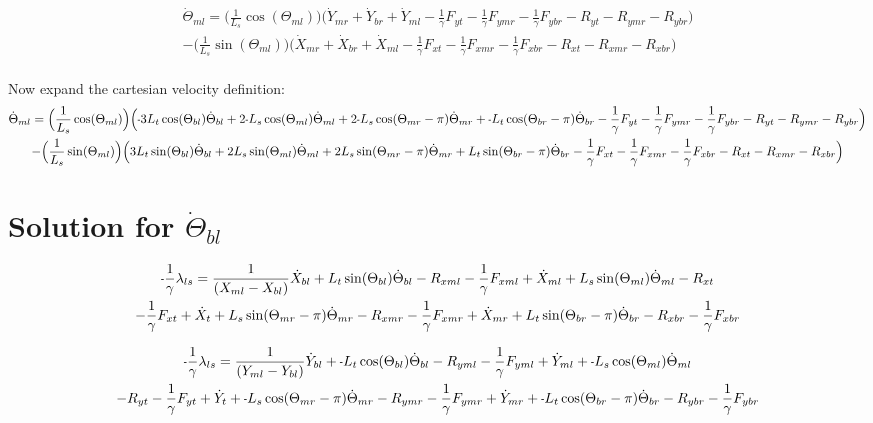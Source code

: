 \documentclass[11pt, landscape]{article}
\newcommand{\mn}{\scalebox{0.7}[1.0]{-}}
\begin{document}
\begin{multline}
\dot{\Theta}_{ml} =
\Big(\frac{1}{L_s}\cos(\Theta_{ml})\Big) \Big(\dot{Y}_{mr} + \dot{Y}_{br} + \dot{Y}_{ml}
- \frac{1}{\gamma}F_{yt } - \frac{1}{\gamma}F_{ymr} - \frac{1}{\gamma}F_{ybr} - R_{yt} - R_{ymr} - R_{ybr} \Big) \\
- \Big(\frac{1}{L_s}\sin(\Theta_{ml})\Big)\Big(\dot{X}_{mr} + \dot{X}_{br} + \dot{X}_{ml}
- \frac{1}{\gamma}F_{xt } - \frac{1}{\gamma}F_{xmr} - \frac{1}{\gamma}F_{xbr} - R_{xt } - R_{xmr} - R_{xbr} \Big)
\end{multline}
\\
Now expand the cartesian velocity definition: \\

\begin{multline}
\dot{\Theta}_{ml} =
\Big(\frac{1}{L_s}\cos(\Theta_{ml})\Big) \Big(\mn3L_{t}\cos(\Theta_{bl})\dot{\Theta}_{bl} + 2\mn L_{s}\cos(\Theta_{ml})\dot{\Theta}_{ml} + 2\mn L_{s}\cos(\Theta_{mr}-\pi)\dot{\Theta}_{mr} + \mn L_{t}\cos(\Theta_{br}-\pi)\dot{\Theta}_{br}
- \frac{1}{\gamma}F_{yt } - \frac{1}{\gamma}F_{ymr} - \frac{1}{\gamma}F_{ybr} - R_{yt} - R_{ymr} - R_{ybr} \Big) \\
- \Big(\frac{1}{L_s}\sin(\Theta_{ml})\Big)\Big(3L_{t}\sin(\Theta_{bl})\dot{\Theta}_{bl} + 2L_{s}\sin(\Theta_{ml})\dot{\Theta}_{ml} + 2L_{s}\sin(\Theta_{mr}-\pi)\dot{\Theta}_{mr} + L_{t}\sin(\Theta_{br}-\pi)\dot{\Theta}_{br}
- \frac{1}{\gamma}F_{xt } - \frac{1}{\gamma}F_{xmr} - \frac{1}{\gamma}F_{xbr} - R_{xt } - R_{xmr} - R_{xbr} \Big)
\end{multline}


\section{Solution for $\dot{\Theta}_{bl}$}

\begin{multline}
\mn\frac{1}{\gamma}\lambda_{ls} =
\frac{1}{(X_{ml} - X_{bl})}\dot{X}_{bl} + L_{t}\sin(\Theta_{bl})      \dot{\Theta}_{bl} - R_{xml} - \frac{1}{\gamma}F_{xml} + \dot{X}_{ml} + L_{s}\sin(\Theta_{ml}) \dot{\Theta}_{ml} - R_{xt } \\
- \frac{1}{\gamma}F_{xt } + \dot{X}_{t } + L_{s}\sin(\Theta_{mr}-\pi)  \dot{\Theta}_{mr} - R_{xmr}
-\frac{1}{\gamma}F_{xmr} + \dot{X}_{mr} + L_{t}\sin(\Theta_{br}-\pi)  \dot{\Theta}_{br} - R_{xbr} - \frac{1}{\gamma}F_{xbr}
\end{multline}

\begin{multline}
\mn\frac{1}{\gamma}\lambda_{ls} =
\frac{1}{(Y_{ml} - Y_{bl})}\dot{Y}_{bl} + \mn L_{t}\cos(\Theta_{bl})      \dot{\Theta}_{bl} - R_{yml} - \frac{1}{\gamma}F_{yml} + \dot{Y}_{ml} + \mn L_{s}\cos(\Theta_{ml}) \dot{\Theta}_{ml} \\
- R_{yt} - \frac{1}{\gamma}F_{yt } + \dot{Y}_{t } + \mn L_{s}\cos(\Theta_{mr}-\pi)  \dot{\Theta}_{mr} - R_{ymr} - \frac{1}{\gamma}F_{ymr} + \dot{Y}_{mr}
+ \mn L_{t}\cos(\Theta_{br}-\pi)  \dot{\Theta}_{br} - R_{ybr} - \frac{1}{\gamma}F_{ybr}
\end{multline}
\end{document}
